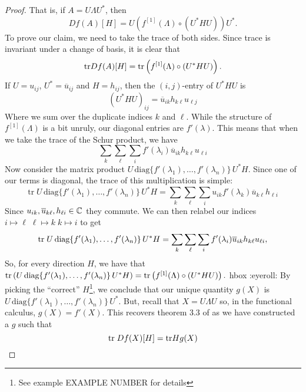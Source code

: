 \begin{proof}
That is, if $A = U   \Lambda U ^{*} $, then
\[
  Df(A)[H] = U \left( f ^{[1]} (\Lambda) \circ (U ^{* } H U) \right)U ^{*}.
\]
%
To prove our claim, we need to take the trace of both sides. Since trace is
invariant under a change of basis, it is clear that
\[
  \mathrm{tr} Df(A)[H] = \mathrm{tr} \left( f ^{[1]} (\Lambda) \circ (U ^{* } H U) \right).
\]
If $U = u_{ij}$, $U ^{*} = \overline{u}_{ij}$ and $H = h_{ij}$, then the
$(i,j)$-entry of $U ^{*}HU$ is
\[
  {(U ^{* } H U)}_{ij} = \overline{u}_{ik}h_{k\ell}u_{\ell j}
\]
Where we sum over the duplicate indices $k$ and $\ell$. While the structure of
$f ^{[1]} (\Lambda)$ is a bit unruly, our diagonal entries are $f'(\lambda)$.
This means that when we take the trace of the Schur product, we have
\[
 \sum_k\sum_\ell \sum_i f'(\lambda_i)\overline{u}_{ik}h_{k\ell}u_{\ell i}
\]
Now consider the matrix product
$U\, \text{diag} \{f'(\lambda_1), \dots ,f'(\lambda_n)\} \,U ^{*} H $. Since one of our terms
is diagonal, the trace of this multiplication is simple:
\[
  \text{tr}\; U \,\text{diag} \{f'(\lambda_1), \dots ,f'(\lambda_n)\}\, U ^{*} H
  = \sum_k\sum_\ell\sum_i  u_{ik}f'(\lambda_k) \overline{u}_{k \ell} h_{\ell i}
\]
Since \(u_{ik}, \overline{u}_{k\ell}, h_{\ell i} \in \mathbb{C} \) they commute. We can
then relabel our indices
$i \mapsto \ell\; \ell \mapsto k \; k \mapsto i $ to get
\[
  \mathrm{tr}\; U \,\text{diag} \{f'(\lambda_1), \dots ,f'(\lambda_n)\}\, U ^{*} H
  = \sum_k\sum_\ell \sum_i f'(\lambda_i) \overline{u}_{i k} h_{k \ell}u_{\ell i},
\]
So, for every direction \(H\), we have that
$\mathrm{tr} \left( U\, \text{diag} \{f'(\lambda_1), \dots ,f'(\lambda_n)\} \,U ^{*} H\right) =
   \mathrm{tr} \left( f ^{[1]} (\Lambda) \circ (U ^{* } H U) \right). $
{\color{red} hbox :eyeroll:}
By picking the ``correct'' \(H\)\footnote{See example EXAMPLE NUMBER for
  details}, we conclude that our unique quantity \(g(X)\) is
\(U\, \text{diag} \{f'(\lambda_1), \dots ,f'(\lambda_n)\} \,U ^{*} \). But,
recall that \(X=U\Lambda U\) so, in the functional calculus, $g(X) = f'(X)$.
This recovers theorem 3.3 of \cite{pascoeTrace2020} as we have constructed a
\(g\) such that
\[
  \mathrm{tr} \; Df(X)[H] = \mathrm{tr} H g(X)
\]
\end{proof}
